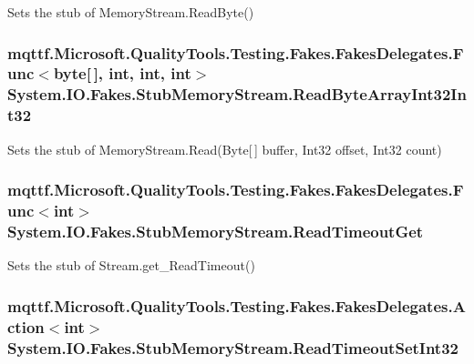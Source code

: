 Sets the stub of Memory\-Stream.\-Read\-Byte()

\hypertarget{class_system_1_1_i_o_1_1_fakes_1_1_stub_memory_stream_aad1d69cdf6c010264b1e68b8830d9ef7}{
\subsubsection[{Read\-Byte\-Array\-Int32\-Int32}]{\setlength{\rightskip}{0pt plus 5cm}mqttf.\-Microsoft.\-Quality\-Tools.\-Testing.\-Fakes.\-Fakes\-Delegates.\-Func$<$byte\mbox{[}$\,$\mbox{]}, int, int, int$>$ System.\-I\-O.\-Fakes.\-Stub\-Memory\-Stream.\-Read\-Byte\-Array\-Int32\-Int32}}\label{class_system_1_1_i_o_1_1_fakes_1_1_stub_memory_stream_aad1d69cdf6c010264b1e68b8830d9ef7}


Sets the stub of Memory\-Stream.\-Read(\-Byte\mbox{[}$\,$\mbox{]} buffer, Int32 offset, Int32 count)

\hypertarget{class_system_1_1_i_o_1_1_fakes_1_1_stub_memory_stream_a489312ba446d7194d6d8d6f4b8cb6199}{
\subsubsection[{Read\-Timeout\-Get}]{\setlength{\rightskip}{0pt plus 5cm}mqttf.\-Microsoft.\-Quality\-Tools.\-Testing.\-Fakes.\-Fakes\-Delegates.\-Func$<$int$>$ System.\-I\-O.\-Fakes.\-Stub\-Memory\-Stream.\-Read\-Timeout\-Get}}\label{class_system_1_1_i_o_1_1_fakes_1_1_stub_memory_stream_a489312ba446d7194d6d8d6f4b8cb6199}


Sets the stub of Stream.\-get\-\_\-\-Read\-Timeout()

\hypertarget{class_system_1_1_i_o_1_1_fakes_1_1_stub_memory_stream_a77b11a8d7e0e665f8c1dfed8d49621ab}{
\subsubsection[{Read\-Timeout\-Set\-Int32}]{\setlength{\rightskip}{0pt plus 5cm}mqttf.\-Microsoft.\-Quality\-Tools.\-Testing.\-Fakes.\-Fakes\-Delegates.\-Action$<$int$>$ System.\-I\-O.\-Fakes.\-Stub\-Memory\-Stream.\-Read\-Timeout\-Set\-Int32}}\label{class_system_1_1_i_o_1_1_fakes_1_1_stub_memory_stream_a77b11a8d7e0e665f8c1dfed8d49621ab}


